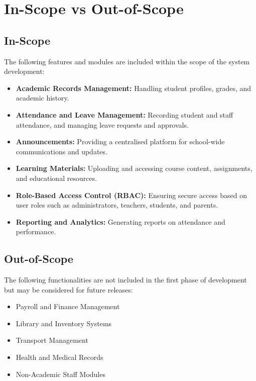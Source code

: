 \documentclass[12pt, a4paper]{report}
\begin{document}
\section{In-Scope vs Out-of-Scope}

\subsection{In-Scope}

The following features and modules are included within the scope of the system development:
\begin{itemize}
    \item \textbf{Academic Records Management:} Handling student profiles, grades, and academic history.
    \item \textbf{Attendance and Leave Management:} Recording student and staff attendance, and managing leave requests and approvals.
    \item \textbf{Announcements:} Providing a centralised platform for school-wide communications and updates.
    \item \textbf{Learning Materials:} Uploading and accessing course content, assignments, and educational resources.
    \item \textbf{Role-Based Access Control (RBAC):} Ensuring secure access based on user roles such as administrators, teachers, students, and parents.
    \item \textbf{Reporting and Analytics:} Generating reports on attendance and performance.
\end{itemize}

\subsection{Out-of-Scope}

The following functionalities are not included in the first phase of development but may be considered for future releases:
\begin{itemize}
    \item Payroll and Finance Management
    \item Library and Inventory Systems
    \item Transport Management
    \item Health and Medical Records
    \item Non-Academic Staff Modules
\end{itemize}
\end{document}
